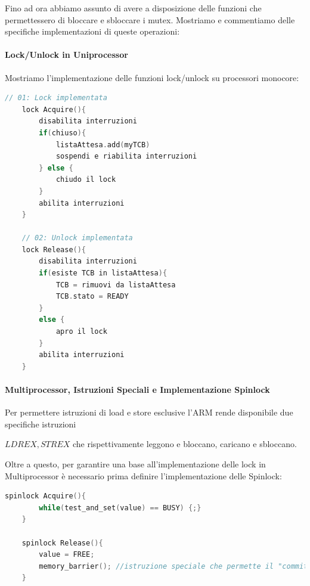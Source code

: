 \documentclass{article}
\begin{document}
Fino ad ora abbiamo assunto di avere a disposizione delle funzioni che permettessero di bloccare e sbloccare i mutex. Mostriamo e commentiamo delle specifiche
implementazioni di queste operazioni:

\paragraph{Lock/Unlock in Uniprocessor} Mostriamo l'implementazione delle funzioni lock/unlock su processori monocore:

\begin{lstlisting}[language = C]
    // 01: Lock implementata 
    lock Acquire(){
        disabilita interruzioni
        if(chiuso){
            listaAttesa.add(myTCB)
            sospendi e riabilita interruzioni
        } else {
            chiudo il lock
        }
        abilita interruzioni
    }    

    // 02: Unlock implementata
    lock Release(){
        disabilita interruzioni
        if(esiste TCB in listaAttesa){
            TCB = rimuovi da listaAttesa
            TCB.stato = READY
        }
        else {
            apro il lock
        }
        abilita interruzioni
    }
\end{lstlisting}

\paragraph{Multiprocessor, Istruzioni Speciali e Implementazione Spinlock}

Per permettere istruzioni di load e store esclusive l'ARM rende disponibile due specifiche istruzioni

$LDREX, STREX$ che rispettivamente leggono e bloccano, caricano e sbloccano.

Oltre a questo, per garantire una base all'implementazione delle lock in Multiprocessor è necessario prima definire l'implementazione delle Spinlock:

\begin{lstlisting}[language = C]
    spinlock Acquire(){
        while(test_and_set(value) == BUSY) {;}
    }

    spinlock Release(){
        value = FREE;
        memory_barrier(); //istruzione speciale che permette il "commit" delle modifiche sulla memoria
    }
    
\end{lstlisting}

\newpage
\end{document}
